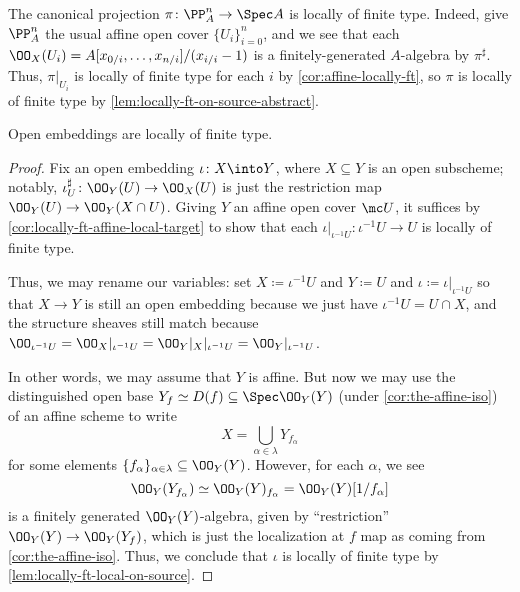 \documentclass[../notes.tex]{subfiles}
\begin{document}
\begin{example} \label{ex:proj-locally-ft}
	The canonical projection $\pi\colon\PP^n_A\to\Spec A$ is locally of finite type. Indeed, give $\PP^n_A$ the usual affine open cover $\{U_i\}_{i=0}^n$, and we see that each $\OO_X(U_i)=A[x_{0/i},\ldots,x_{n/i}]/(x_{i/i}-1)$ is a finitely-generated $A$-algebra by $\pi^\sharp$. Thus, $\pi|_{U_i}$ is locally of finite type for each $i$ by \autoref{cor:affine-locally-ft}, so $\pi$ is locally of finite type by \autoref{lem:locally-ft-on-source-abstract}.
\end{example}
\begin{corollary}
	Open embeddings are locally of finite type.
\end{corollary}
\begin{proof}
	Fix an open embedding $\iota\colon X\into Y$, where $X\subseteq Y$ is an open subscheme; notably, $\iota^\sharp_U\colon\OO_Y(U)\to\OO_X(U)$ is just the restriction map $\OO_Y(U)\to\OO_Y(X\cap U)$. Giving $Y$ an affine open cover $\mc U$, it suffices by \autoref{cor:locally-ft-affine-local-target} to show that each $\iota|_{\iota^{-1}U}\colon\iota^{-1}U\to U$ is locally of finite type.

	Thus, we may rename our variables: set $X\coloneqq\iota^{-1}U$ and $Y\coloneqq U$ and $\iota\coloneqq\iota|_{\iota^{-1}U}$ so that $X\to Y$ is still an open embedding because we just have $\iota^{-1}U=U\cap X$, and the structure sheaves still match because $\OO_{\iota^{-1}U}=\OO_X|_{\iota^{-1}U}=\OO_Y|_X|_{\iota^{-1}U}=\OO_Y|_{\iota^{-1}U}$.

	In other words, we may assume that $Y$ is affine. But now we may use the distinguished open base $Y_f\simeq D(f)\subseteq\Spec\OO_Y(Y)$ (under \autoref{cor:the-affine-iso}) of an affine scheme to write
	\[X=\bigcup_{\alpha\in\lambda}Y_{f_\alpha}\]
	for some elements $\{f_\alpha\}_{\alpha\in\lambda}\subseteq\OO_Y(Y)$. However, for each $\alpha$, we see
	\[\OO_Y(Y_{f_\alpha})\simeq\OO_Y(Y)_{f_\alpha}=\OO_Y(Y)[1/f_\alpha]\]
	is a finitely generated $\OO_Y(Y)$-algebra, given by ``restriction'' $\OO_Y(Y)\to\OO_Y(Y_f)$, which is just the localization at $f$ map as coming from \autoref{cor:the-affine-iso}. Thus, we conclude that $\iota$ is locally of finite type by \autoref{lem:locally-ft-local-on-source}.
\end{proof}
\end{document}
